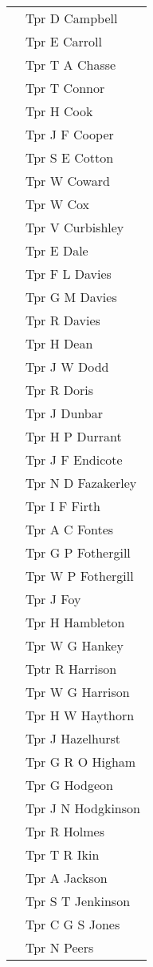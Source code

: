 \begin{center}
\begin{tabular}{rl}
    & Tpr D Campbell \\
    & Tpr E Carroll \\
    & Tpr T A Chasse \\
    & Tpr T Connor \\
    & Tpr H Cook \\
    & Tpr J F Cooper \\
    & Tpr S E Cotton \\
    & Tpr W Coward \\
    & Tpr W Cox \\
    & Tpr V Curbishley \\
    & Tpr E Dale \\
    & Tpr F L Davies \\
    & Tpr G M Davies \\
    & Tpr R Davies \\
    & Tpr H Dean \\
    & Tpr J W Dodd \\
    & Tpr R Doris \\
    & Tpr J Dunbar \\
    & Tpr H P Durrant \\
    & Tpr J F Endicote \\
    & Tpr N D Fazakerley \\
    & Tpr I F Firth \\
    & Tpr A C Fontes \\
    & Tpr G P Fothergill \\
    & Tpr W P Fothergill \\
    & Tpr J Foy \\
    & Tpr H Hambleton \\
    & Tpr W G Hankey \\
    & Tptr R Harrison \\
    & Tpr W G Harrison \\
    & Tpr H W Haythorn \\
    & Tpr J Hazelhurst \\
    & Tpr G R O Higham \\
    & Tpr G Hodgeon \\
    & Tpr J N Hodgkinson \\
    & Tpr R Holmes \\
    & Tpr T R Ikin \\
    & Tpr A Jackson \\
    & Tpr S T Jenkinson \\
    & Tpr C G S Jones \\
    & Tpr N Peers \\

\end{tabular}
\end{center}
